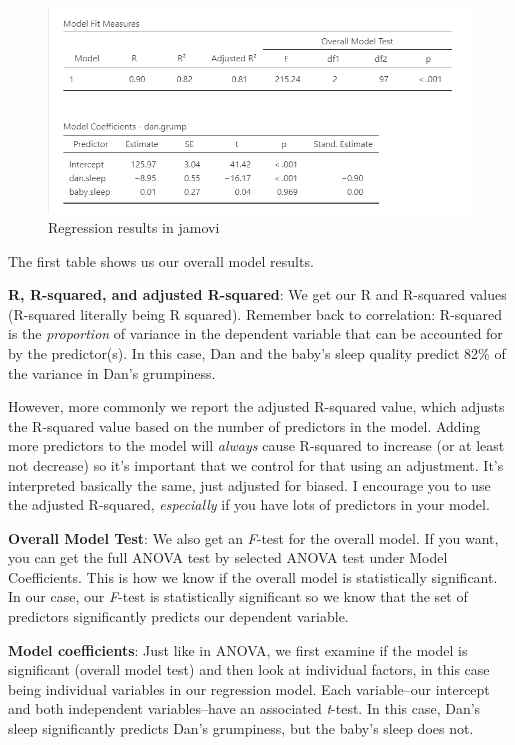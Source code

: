 \documentclass[
]{book}
\begin{document}
\begin{figure}

{\centering \includegraphics[width=1\linewidth]{images/13-regression/regression-results} 

}

\caption{Regression results in jamovi}\label{fig:unnamed-chunk-10}
\end{figure}

The first table shows us our overall model results.

\textbf{R, R-squared, and adjusted R-squared}: We get our R and R-squared values (R-squared literally being R squared). Remember back to correlation: R-squared is the \emph{proportion} of variance in the dependent variable that can be accounted for by the predictor(s). In this case, Dan and the baby's sleep quality predict 82\% of the variance in Dan's grumpiness.

However, more commonly we report the adjusted R-squared value, which adjusts the R-squared value based on the number of predictors in the model. Adding more predictors to the model will \emph{always} cause R-squared to increase (or at least not decrease) so it's important that we control for that using an adjustment. It's interpreted basically the same, just adjusted for biased. I encourage you to use the adjusted R-squared, \emph{especially} if you have lots of predictors in your model.

\textbf{Overall Model Test}: We also get an \emph{F}-test for the overall model. If you want, you can get the full ANOVA test by selected ANOVA test under Model Coefficients. This is how we know if the overall model is statistically significant. In our case, our \emph{F}-test is statistically significant so we know that the set of predictors significantly predicts our dependent variable.

\textbf{Model coefficients}: Just like in ANOVA, we first examine if the model is significant (overall model test) and then look at individual factors, in this case being individual variables in our regression model. Each variable--our intercept and both independent variables--have an associated \emph{t}-test. In this case, Dan's sleep significantly predicts Dan's grumpiness, but the baby's sleep does not.
\end{document}

